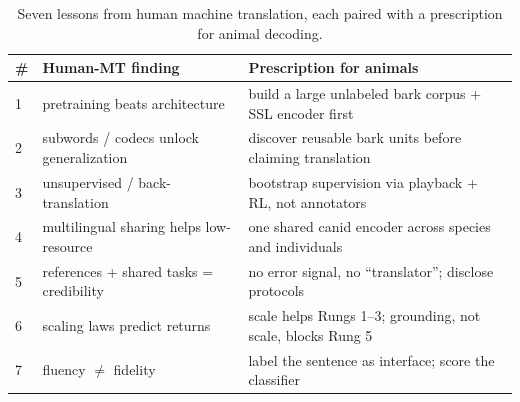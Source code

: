 \begin{table}[htbp]
\centering
\caption{Seven lessons from human machine translation, each paired with a
prescription for animal decoding.}
\label{tab:lessons}
\small
\setlength{\tabcolsep}{4pt}
\begin{tabular}{@{}p{0.6cm}p{4.7cm}p{8.0cm}@{}}
\toprule
\textbf{\#} & \textbf{Human-MT finding} & \textbf{Prescription for animals} \\
\midrule
1 & pretraining beats architecture~\cite{devlin2019bert,baevski2020wav2vec2} & build a large unlabeled bark corpus + SSL encoder first \\
2 & subwords / codecs unlock generalization~\cite{sennrich2016bpe,sharma2024whale} & discover reusable bark units before claiming translation \\
3 & unsupervised / back-translation~\cite{artetxe2018unsupervised,sennrich2016improving} & bootstrap supervision via playback + RL, not annotators \\
4 & multilingual sharing helps low-resource~\cite{costajussa2022nllb,johnson2017multilingual} & one shared canid encoder across species and individuals \\
5 & references + shared tasks = credibility~\cite{papineni2002bleu,bojar2018wmt} & no error signal, no ``translator''; disclose protocols \\
6 & scaling laws predict returns~\cite{kaplan2020scaling} & scale helps Rungs 1--3; grounding, not scale, blocks Rung 5 \\
7 & fluency $\neq$ fidelity~\cite{ji2023hallucination,maynez2020faithfulness} & label the sentence as interface; score the classifier \\
\bottomrule
\end{tabular}
\end{table}